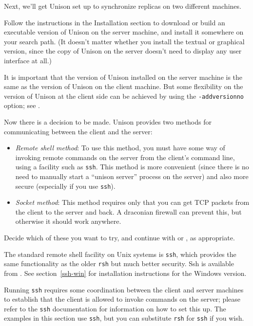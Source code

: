 \documentclass{article}
\begin{document}

Next, we'll get Unison set up to synchronize replicas on two different
machines.

Follow the instructions in the Installation section to download or
build an executable version of Unison on the server machine, and
install it somewhere on your search path.  (It doesn't matter whether
you install the textual or graphical version, since the copy of Unison on
the server doesn't need to display any user interface at all.)

It is important that the version of Unison installed on the server
machine is the same as the version of Unison on the client machine.
But some flexibility on the version of Unison at the client side can
be achieved by using the \verb|-addversionno| option; see
.

Now there is a decision to be made.  Unison provides two methods for
communicating between the client and the server:
\begin{itemize}
\item {\em Remote shell method}: To use this method, you must have
  some way of invoking remote commands on the server from the client's
  command line, using a facility such as \verb|ssh|.
  This method is more convenient (since there is no need to manually
  start a ``unison server'' process on the server) and also more
  secure (especially if you use \verb|ssh|).

\item {\em Socket method}: This method requires only that you can get
  TCP packets from the client to the server and back.  A draconian
  firewall can prevent this, but otherwise it should work anywhere.
\end{itemize}

Decide which of these you want to try, and continue with
 or
, as appropriate.



The standard remote shell facility on Unix systems is \verb|ssh|, which provides the
same functionality as the older \verb|rsh| but much better security.  Ssh is available from
.  See section~\ref{ssh-win}
for installation instructions for the Windows version.

Running
\verb|ssh| requires some coordination between the client and server
machines to establish that the client is allowed to invoke commands on
the server; please refer to the \verb|ssh| documentation
for information on how to set this up.  The examples in this section
use \verb|ssh|, but you can substitute \verb|rsh| for \verb|ssh| if
you wish.
\end{document}
